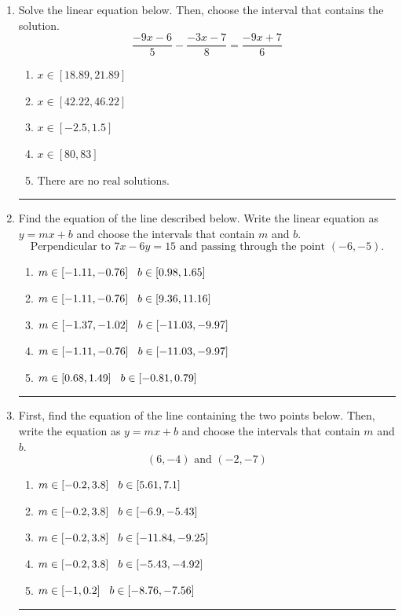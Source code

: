 \documentclass[14pt]{extbook}
\newcommand{\litem}[1]{\item#1\hspace*{-1cm}\rule{\textwidth}{0.4pt}}
\begin{document}
\begin{enumerate}
{\begin{enumerate}[label=\Alph*.]
\end{enumerate} }
\litem{
Solve the linear equation below. Then, choose the interval that contains the solution.\[ \frac{-9x -6}{5} - \frac{-3x -7}{8} = \frac{-9x + 7}{6} \]\begin{enumerate}[label=\Alph*.]
\item \( x \in [18.89, 21.89] \)
\item \( x \in [42.22, 46.22] \)
\item \( x \in [-2.5, 1.5] \)
\item \( x \in [80, 83] \)
\item \( \text{There are no real solutions.} \)

\end{enumerate} }
\litem{
Find the equation of the line described below. Write the linear equation as $ y=mx+b $ and choose the intervals that contain $m$ and $b$.\[ \text{Perpendicular to } 7 x - 6 y = 15 \text{ and passing through the point } (-6, -5). \]\begin{enumerate}[label=\Alph*.]
\item \( m \in [-1.11, -0.76] \hspace*{3mm} b \in [0.98, 1.65] \)
\item \( m \in [-1.11, -0.76] \hspace*{3mm} b \in [9.36, 11.16] \)
\item \( m \in [-1.37, -1.02] \hspace*{3mm} b \in [-11.03, -9.97] \)
\item \( m \in [-1.11, -0.76] \hspace*{3mm} b \in [-11.03, -9.97] \)
\item \( m \in [0.68, 1.49] \hspace*{3mm} b \in [-0.81, 0.79] \)

\end{enumerate} }
\litem{
First, find the equation of the line containing the two points below. Then, write the equation as $ y=mx+b $ and choose the intervals that contain $m$ and $b$.\[ (6, -4) \text{ and } (-2, -7) \]\begin{enumerate}[label=\Alph*.]
\item \( m \in [-0.2, 3.8] \hspace*{3mm} b \in [5.61, 7.1] \)
\item \( m \in [-0.2, 3.8] \hspace*{3mm} b \in [-6.9, -5.43] \)
\item \( m \in [-0.2, 3.8] \hspace*{3mm} b \in [-11.84, -9.25] \)
\item \( m \in [-0.2, 3.8] \hspace*{3mm} b \in [-5.43, -4.92] \)
\item \( m \in [-1, 0.2] \hspace*{3mm} b \in [-8.76, -7.56] \)


\end{enumerate}}
\end{enumerate}
\end{document}
